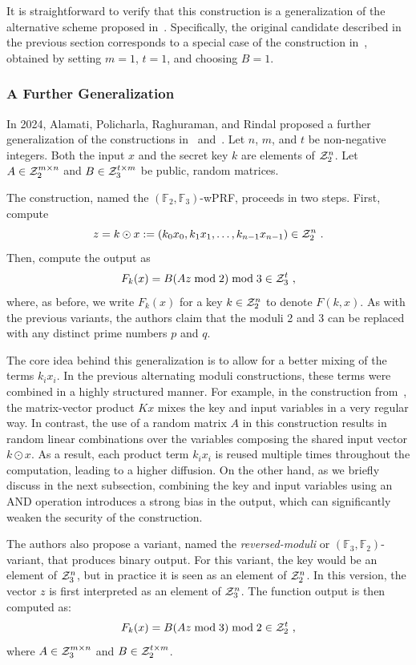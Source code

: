 It is straightforward to verify that this construction is a generalization of the alternative scheme proposed in~\cite{TCC:BIPSW18}. Specifically, the original candidate described in the previous section corresponds to a special case of the construction in~\cite{C:DGHIKS21}, obtained by setting $m = 1$, $t = 1$, and choosing $B = 1$.



\subsubsection{A Further Generalization~\cite{C:APRR24}}

In 2024, Alamati, Policharla, Raghuraman, and Rindal proposed a further generalization of the constructions in~\cite{TCC:BIPSW18} and~\cite{C:DGHIKS21}. Let $n$, $m$, and $t$ be non-negative integers. Both the input $x$ and the secret key $k$ are elements of $\mathcal{Z}_2^n$. Let $A \in \mathcal{Z}_2^{m \times n}$ and $B \in \mathcal{Z}_3^{t \times m}$ be public, random matrices.

The construction, named the $(\mathbb{F}_2, \mathbb{F}_3)$-wPRF, proceeds in two steps. First, compute
\[
z = k \odot  x:= (k_0 x_0, k_1 x_1, \dots, k_{n-1} x_{n-1}) \in \mathcal{Z}_2^n~.
\]
Then, compute the output as
\[
F_k(x) = B(Az \bmod 2) \bmod 3 \in \mathcal{Z}_3^t~,
\]
where, as before, we write $F_k(x)$ for a key $k \in \mathcal{Z}_2^n$ to denote $F(k, x)$.
As with the previous variants, the authors claim that the moduli 2 and 3 can be replaced with any distinct prime numbers $p$ and $q$.

The core idea behind this generalization is to allow for a better mixing of the terms $k_i x_i$. In the previous alternating moduli constructions, these terms were combined in a highly structured manner. For example, in the construction from~\cite{C:DGHIKS21}, the matrix-vector product $Kx$ mixes  the key and input variables in a very regular  way. In contrast, the use of a random matrix $A$ in this construction results in random linear combinations over the variables composing the shared input vector $k \odot x$. As a result, each product term $k_i x_i$ is reused multiple times throughout the computation,  leading to a higher diffusion. On the other hand, as we briefly discuss in the next subsection, combining the key and input variables using an AND operation introduces a strong bias in the output, which can significantly weaken the security of the construction.

The authors also propose a variant, named the \emph{reversed-moduli} or $(\mathbb{F}_3, \mathbb{F}_2)$-variant,  that produces binary output. For this variant, the key would be an element of $\mathcal{Z}_3^n$, but in practice it is seen as an element of $\mathcal{Z}_2^n$. In this version, the vector $z$ is first interpreted as an element of $\mathcal{Z}_3^n$. The function output is then computed as:
\[
F_k(x) = B(Az \bmod 3) \bmod 2 \in \mathcal{Z}_2^t~,
\]
where $A \in \mathcal{Z}_3^{m \times n}$ and $B \in \mathcal{Z}_2^{t \times m}$.



